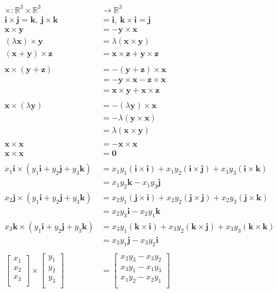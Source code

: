 \documentclass[a4paper,11pt]{article}
\theoremstyle{plain}
\theoremstyle{definition}
\newcommand{\R}{\mathbb{R}}
\newcommand{\jhat}{\mathbf{j}}
\newcommand{\ihat}{\mathbf{i}}
\newcommand{\khat}{\mathbf{k}}
\begin{document}
\begin{align*}
	\times:\R^3\times\R^3&\to\R^3\\
	\ihat\times\jhat = \khat,\ \jhat\times\khat &= \ihat,\
	\khat\times\ihat = \jhat \\
	\mathbf{x}\times\mathbf{y} &= -\mathbf{y}\times\mathbf{x} \\
	(\lambda\mathbf{x})\times\mathbf{y} &= \lambda(\mathbf{x}\times\mathbf{y})\\
	(\mathbf{x}+\mathbf{y})\times\mathbf{z} &=
	\mathbf{x}\times\mathbf{z}+\mathbf{y}\times\mathbf{z}\\
	\\
	\mathbf{x}\times(\mathbf{y}+\mathbf{z}) &=
	-(\mathbf{y}+\mathbf{z})\times\mathbf{x} \\
	&=-\mathbf{y}\times\mathbf{x}-\mathbf{z}\times\mathbf{x} \\
	&=\mathbf{x}\times\mathbf{y}+\mathbf{x}\times\mathbf{z} \\
	\\
	\mathbf{x}\times(\lambda\mathbf{y})&= -(\lambda\mathbf{y})\times\mathbf{x}\\
									   &= -\lambda(\mathbf{y}\times\mathbf{x})\\
									   &= \lambda(\mathbf{x}\times\mathbf{y}) \\
	\\
	\mathbf{x}\times\mathbf{x} &= -\mathbf{x}\times\mathbf{x} \\
	\mathbf{x}\times\mathbf{x} &= \mathbf{0} \\
	\\
	x_1\ihat\times(y_1\ihat+y_2\jhat+y_3\khat)
	&= x_1y_1(\ihat\times\ihat)+x_1y_2(\ihat\times\jhat)+x_1y_3(\ihat\times\khat) \\
	&= x_1y_2\khat-x_1y_3\jhat \\
	x_2\jhat\times(y_1\ihat+y_2\jhat+y_3\khat) &= 
	x_2y_1(\jhat\times\ihat)+x_2y_2(\jhat\times\jhat)+x_2y_3(\jhat\times\khat)\\
	&= x_2y_3\ihat-x_2y_1\khat\\
	x_3\khat\times(y_1\ihat+y_2\jhat+y_3\khat) &= 
	x_3y_1(\khat\times\ihat)+x_3y_2(\khat\times\jhat)+x_3y_3(\khat\times\khat)\\
	&= x_3y_1\jhat-x_3y_2\ihat\\
	\\
	\begin{bmatrix}
		x_1 \\
		x_2 \\
		x_3 \\
	\end{bmatrix}
	{\times}
	\begin{bmatrix}
		y_1 \\
		y_2 \\
		y_3 \\
	\end{bmatrix}
	&=
	\begin{bmatrix}
		x_2y_3-x_3y_2 \\
		x_3y_1-x_1y_3 \\
		x_1y_2-x_2y_1 \\
	\end{bmatrix} \\
\end{align*}
\end{document}
